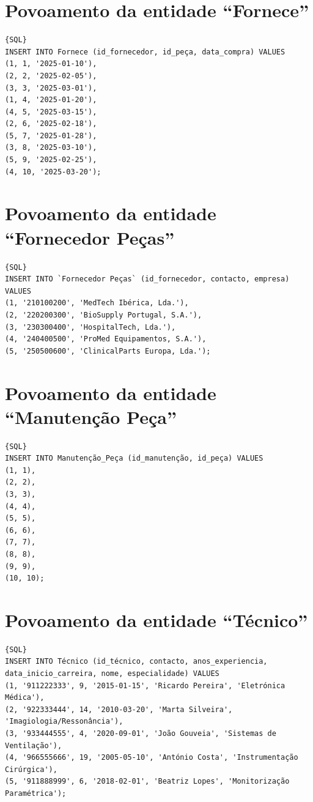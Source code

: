\section{Povoamento da entidade “Fornece”}
{\small
\begin{lstlisting}[breaklines]{SQL}
INSERT INTO Fornece (id_fornecedor, id_peça, data_compra) VALUES
(1, 1, '2025-01-10'),  
(2, 2, '2025-02-05'),  
(3, 3, '2025-03-01'),  
(1, 4, '2025-01-20'), 
(4, 5, '2025-03-15'),  
(2, 6, '2025-02-18'),  
(5, 7, '2025-01-28'),  
(3, 8, '2025-03-10'), 
(5, 9, '2025-02-25'),  
(4, 10, '2025-03-20'); 
\end{lstlisting}
}

\section{Povoamento da entidade “Fornecedor Peças”}
{\small
\begin{lstlisting}[breaklines]{SQL}
INSERT INTO `Fornecedor Peças` (id_fornecedor, contacto, empresa) VALUES
(1, '210100200', 'MedTech Ibérica, Lda.'),
(2, '220200300', 'BioSupply Portugal, S.A.'),
(3, '230300400', 'HospitalTech, Lda.'),
(4, '240400500', 'ProMed Equipamentos, S.A.'),
(5, '250500600', 'ClinicalParts Europa, Lda.');
\end{lstlisting}
}

\section{Povoamento da entidade “Manutenção Peça”}
{\small
\begin{lstlisting}[breaklines]{SQL}
INSERT INTO Manutenção_Peça (id_manutenção, id_peça) VALUES
(1, 1), 
(2, 2),  
(3, 3),  
(4, 4), 
(5, 5), 
(6, 6), 
(7, 7),  
(8, 8), 
(9, 9),  
(10, 10);
\end{lstlisting}
}

\section{Povoamento da entidade “Técnico”}
{\small
\begin{lstlisting}[breaklines]{SQL}
INSERT INTO Técnico (id_técnico, contacto, anos_experiencia, data_inicio_carreira, nome, especialidade) VALUES
(1, '911222333', 9, '2015-01-15', 'Ricardo Pereira', 'Eletrónica Médica'),
(2, '922333444', 14, '2010-03-20', 'Marta Silveira', 'Imagiologia/Ressonância'),
(3, '933444555', 4, '2020-09-01', 'João Gouveia', 'Sistemas de Ventilação'),
(4, '966555666', 19, '2005-05-10', 'António Costa', 'Instrumentação Cirúrgica'),
(5, '911888999', 6, '2018-02-01', 'Beatriz Lopes', 'Monitorização Paramétrica');
\end{lstlisting}
}

